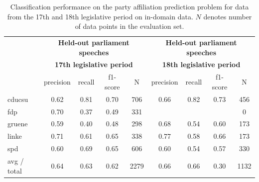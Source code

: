 \documentclass{article}
\begin{document}
\begin{table}[t]
\caption{
\label{tab:results_in-domain}
Classification performance on the party affiliation prediction problem for data from the 17th and 18th legislative period on in-domain data. $N$ denotes number of data points in the evaluation set.
}
\begin{center}
\begin{tabular}{lcccccccc}
& \multicolumn{4}{c}{\bf Held-out parliament speeches} & \multicolumn{4}{c}{\bf Held-out parliament speeches}\\
& \multicolumn{4}{c}{\bf 17th legislative period} & \multicolumn{4}{c}{\bf 18th legislative period}\\
    &         precision    &recall &  f1-score  & N    &         precision    &recall &  f1-score  & N\\
\hline \hline
       cducsu   &    0.62  &    0.81  &    0.70  &     706&0.66    &  0.82   &   0.73    &  456\\
        fdp    &   0.70   &   0.37  &    0.49    &   331&   &      &     &   0\\
     gruene &      0.59  &    0.40   &   0.48   &    298&0.68  &    0.54   &   0.60 &     173\\
      linke    &   0.71   &   0.61  &    0.65    &   338&0.77   &   0.58   &   0.66    &  173\\
        spd   &    0.60   &   0.69  &    0.65   &    606&0.60   &   0.54   &   0.57  &    330\\
\hline
avg / total &      0.64   &   0.63   &   0.62    &  2279 &0.66    &  0.66 &     0.30   &  1132
%
\end{tabular}
\end{center}
\end{table}
\end{document}
